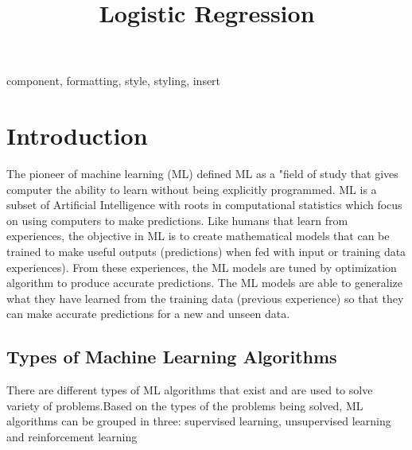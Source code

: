 \documentclass[conference]{IEEEtran}
\begin{document}
\title{Logistic Regression\\
}

\author{
}

\maketitle

\begin{abstract}

\end{abstract}

\begin{IEEEkeywords}
component, formatting, style, styling, insert
\end{IEEEkeywords}

\section{Introduction}
The pioneer of machine learning (ML) defined ML as a "field of study that gives computer the ability to learn without being explicitly programmed. \cite{bb1} ML is a subset of Artificial Intelligence with roots in computational statistics which focus on using computers to make predictions. Like humans that learn from experiences, the objective in ML is to create mathematical models that can be trained to make useful outputs (predictions) when fed with input or training data experiences). From these experiences, the ML models are tuned by optimization
algorithm to produce accurate predictions. The ML models are able to generalize what they have learned from the training data (previous experience) so that they can make accurate predictions for a new and unseen data.\cite{bb2}

\subsection{Types of Machine Learning Algorithms}
There are different types of ML algorithms that exist and are used to solve variety of problems.Based on the types of the problems being solved, ML algorithms can be grouped in three: supervised learning, unsupervised learning and reinforcement learning
\end{document}
